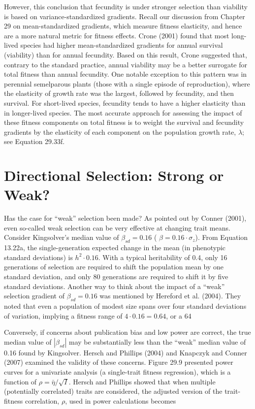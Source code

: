 \documentclass{article}
\begin{document}
However, this conclusion that fecundity is under stronger selection than viability is based on variance-standardized gradients. Recall our discussion from Chapter 29 on mean-standardized gradients, which measure fitness elasticity, and hence are a more natural metric for fitness effects. Crone (2001) found that most long-lived species had higher mean-standardized gradients for annual survival (viability) than for annual fecundity. Based on this result, Crone suggested that, contrary to the standard practice, annual viability may be a better surrogate for total fitness than annual fecundity. One notable exception to this pattern was in perennial semelparous plants (those with a single episode of reproduction), where the elasticity of growth rate was the largest, followed by fecundity, and then survival. For short-lived species, fecundity tends to have a higher elasticity than in longer-lived species. The most accurate approach for assessing the impact of these fitness components on total fitness is to weight the survival and fecundity gradients by the elasticity of each component on the population growth rate,  $ \lambda $; see Equation 29.33f.

\section{Directional Selection: Strong or Weak?}
Has the case for “weak” selection been made? As pointed out by Conner (2001), even so-called weak selection can be very effective at changing trait means. Consider Kingsolver’s median value of  $ \beta_{sd} = 0.16 $ ( $ \beta = 0.16 \cdot \sigma_z $). From Equation 13.22a, the single-generation expected change in the mean (in phenotypic standard deviations) is  $ h^2 \cdot 0.16 $. With a typical heritability of 0.4, only 16 generations of selection are required to shift the population mean by one standard deviation, and only 80 generations are required to shift it by five standard deviations. Another way to think about the impact of a “weak” selection gradient of  $ \beta_{sd} = 0.16 $ was mentioned by Hereford et al. (2004). They noted that even a population of modest size spans over four standard deviations of variation, implying a fitness range of  $ 4 \cdot 0.16 = 0.64 $, or a 64%

Conversely, if concerns about publication bias and low power are correct, the true median value of  $ |\beta_{sd}| $ may be substantially less than the “weak” median value of 0.16 found by Kingsolver. Hersch and Phillips (2004) and Knapczyk and Conner (2007) examined the validity of these concerns. Figure 29.9 presented power curves for a univariate analysis (a single-trait fitness regression), which is a function of  $ \rho = \bar{\eta}/\sqrt{I} $. Hersch and Phillips showed that when multiple (potentially correlated) traits are considered, the adjusted version of the trait-fitness correlation,  $ \rho $, used in power calculations becomes
\end{document}
